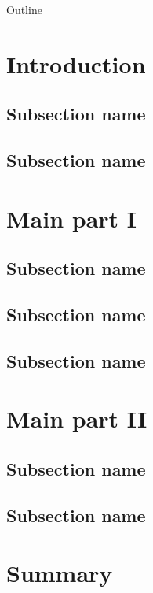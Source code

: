 \documentclass{beamer}
\begin{document}
\frame{\titlepage}
\begin{frame}{Outline}
     \tableofcontents
\end{frame}

\section{Introduction}
\subsection{Subsection name}
\frame{}
\subsection{Subsection name}
\frame{}

\section{Main part I}
\subsection{Subsection name}
\frame{}
\subsection{Subsection name}
\frame{}
\subsection{Subsection name}
\frame{}

\section{Main part II}
\subsection{Subsection name}
\frame{}
\subsection{Subsection name}
\frame{}

\section{Summary}
\appendix
{}
\end{document}
